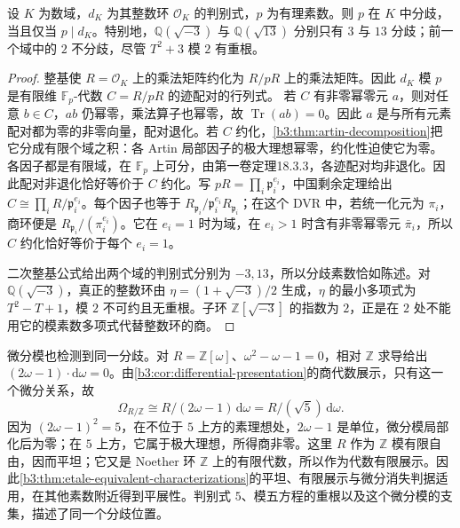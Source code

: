 \begin{proposition}\label{b3:prop:discriminant-ramification}\label{b3:prop:quadratic-discriminant-primes}
	设 \(K\) 为数域，\(d_K\) 为其整数环 \(\mathcal O_K\) 的判别式，\(p\) 为有理素数。则 \(p\) 在 \(K\) 中分歧，当且仅当 \(p\mid d_K\)。特别地，\(\mathbb Q(\sqrt{-3})\) 与 \(\mathbb Q(\sqrt{13})\) 分别只有 \(3\) 与 \(13\) 分歧；前一个域中的 \(2\) 不分歧，尽管 \(T^2+3\) 模 \(2\) 有重根。
\end{proposition}
\begin{proof}
	整基使 \(R=\mathcal O_K\) 上的乘法矩阵约化为 \(R/pR\) 上的乘法矩阵。因此 \(d_K\) 模 \(p\) 是有限维 \(\mathbb F_p\)-代数 \(C=R/pR\) 的迹配对的行列式。
	若 \(C\) 有非零幂零元 \(a\)，则对任意 \(b\in C\)，\(ab\) 仍幂零，乘法算子也幂零，故 \(\operatorname{Tr}(ab)=0\)。因此 \(a\) 是与所有元素配对都为零的非零向量，配对退化。若 \(C\) 约化，\cref{b3:thm:artin-decomposition}把它分成有限个域之积：各 Artin 局部因子的极大理想幂零，约化性迫使它为零。各因子都是有限域，在 \(\mathbb F_p\) 上可分，由第一卷定理18.3.3，各迹配对均非退化。因此配对非退化恰好等价于 \(C\) 约化。写 \(pR=\prod_i\mathfrak p_i^{e_i}\)，中国剩余定理给出 \(C\cong\prod_iR/\mathfrak p_i^{e_i}\)。每个因子也等于 \(R_{\mathfrak p_i}/\mathfrak p_i^{e_i}R_{\mathfrak p_i}\)；在这个 DVR 中，若统一化元为 \(\pi_i\)，商环便是 \(R_{\mathfrak p_i}/(\pi_i^{e_i})\)。它在 \(e_i=1\) 时为域，在 \(e_i>1\) 时含有非零幂零元 \(\bar\pi_i\)，所以 \(C\) 约化恰好等价于每个 \(e_i=1\)。

	二次整基公式给出两个域的判别式分别为 \(-3,13\)，所以分歧素数恰如陈述。对 \(\mathbb Q(\sqrt{-3})\)，真正的整数环由 \(\eta=(1+\sqrt{-3})/2\) 生成，\(\eta\) 的最小多项式为 \(T^2-T+1\)，模 \(2\) 不可约且无重根。子环 \(\mathbb Z[\sqrt{-3}]\) 的指数为 \(2\)，正是在 \(2\) 处不能用它的模素数多项式代替整数环的商。
\end{proof}

微分模也检测到同一分歧。对 \(R=\mathbb Z[\omega]\)、\(\omega^2-\omega-1=0\)，相对 \(\mathbb Z\) 求导给出 \((2\omega-1)\cdot\mathrm{d}\omega=0\)。由\cref{b3:cor:differential-presentation}的商代数展示，只有这一个微分关系，故
\[
	\Omega_{R/\mathbb Z} \cong R/(2\omega-1)\,\mathrm{d}\omega =R/(\sqrt5)\,\mathrm{d}\omega.
\]
因为 \((2\omega-1)^2=5\)，在不位于 \(5\) 上方的素理想处，\(2\omega-1\) 是单位，微分模局部化后为零；在 \(5\) 上方，它属于极大理想，所得商非零。这里 \(R\) 作为 \(\mathbb Z\) 模有限自由，因而平坦；它又是 Noether 环 \(\mathbb Z\) 上的有限代数，所以作为代数有限展示。因此\cref{b3:thm:etale-equivalent-characterizations}的平坦、有限展示与微分消失判据适用，在其他素数附近得到平展性。判别式 \(5\)、模五方程的重根以及这个微分模的支集，描述了同一个分歧位置。

